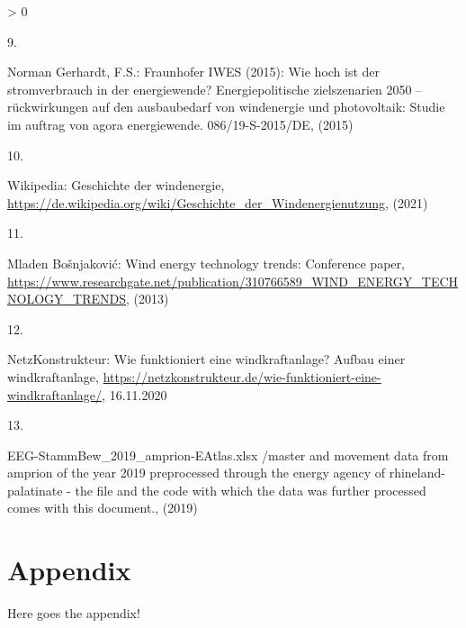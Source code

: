 \documentclass[a4paper,11pt]{article}
\newlength{\cslhangindent}
\newlength{\csllabelwidth}
\newenvironment{CSLReferences}[3] %
 {%
  \setlength{\parindent}{0pt}
  \ifodd #1 \everypar{\setlength{\hangindent}{\cslhangindent}}\ignorespaces\fi
  \ifnum #2 > 0
  \setlength{\parskip}{#2\baselineskip}
  \fi
 }%
 {}
\newcommand{\CSLLeftMargin}[1]{\parbox[t]{\maxof{\widthof{#1}}{\csllabelwidth}}{#1}}
\newcommand{\CSLRightInline}[1]{\parbox[t]{\linewidth}{#1}}
\begin{document}
\begin{CSLReferences}{0}{0}
\leavevmode\hypertarget{ref-NormanGerhardt.2015}{}%
\CSLLeftMargin{9. }
\CSLRightInline{Norman Gerhardt, F.S.: Fraunhofer IWES (2015): Wie hoch ist der stromverbrauch in der energiewende? Energiepolitische zielszenarien 2050 -- r{ü}ckwirkungen auf den ausbaubedarf von windenergie und photovoltaik: Studie im auftrag von agora energiewende. 086/19-S-2015/DE, (2015)}

\leavevmode\hypertarget{ref-Wikipedia.2021}{}%
\CSLLeftMargin{10. }
\CSLRightInline{Wikipedia: Geschichte der windenergie, \url{https://de.wikipedia.org/wiki/Geschichte_der_Windenergienutzung}, (2021)}

\leavevmode\hypertarget{ref-MladenBosnjakovic.2013}{}%
\CSLLeftMargin{11. }
\CSLRightInline{Mladen Bošnjaković: Wind energy technology trends: Conference paper, \url{https://www.researchgate.net/publication/310766589_WIND_ENERGY_TECHNOLOGY_TRENDS}, (2013)}

\leavevmode\hypertarget{ref-NetzKonstrukteur.16.11.2020}{}%
\CSLLeftMargin{12. }
\CSLRightInline{NetzKonstrukteur: Wie funktioniert eine windkraftanlage? Aufbau einer windkraftanlage, \url{https://netzkonstrukteur.de/wie-funktioniert-eine-windkraftanlage/}, 16.11.2020}

\leavevmode\hypertarget{ref-EnergieagenturRheinlandPfalz.2019}{}%
\CSLLeftMargin{13. }
\CSLRightInline{EEG-StammBew{\_}2019{\_}amprion-EAtlas.xlsx /master and movement data from amprion of the year 2019 preprocessed through the energy agency of rhineland-palatinate - the file and the code with which the data was further processed comes with this document., (2019)}

\end{CSLReferences}
\indent
\setlength{\parindent}{17pt}
\setlength{\leftskip}{0pt}
\setlength{\parskip}{0pt}

\newpage

\appendix

\hypertarget{appendix}{%
\section{Appendix}\label{appendix}}

Here goes the appendix!
\end{document}
